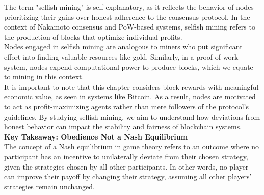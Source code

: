   The term "selfish mining" is self-explanatory, as it reflects the behavior of nodes prioritizing their gains over honest adherence to the consensus protocol. In the context of Nakamoto consensus and PoW-based systems, selfish mining refers to the production of blocks that optimize individual profits.\\
  Nodes engaged in selfish mining are analogous to miners who put significant effort into finding valuable resources like gold. Similarly, in a proof-of-work system, nodes expend computational power to produce blocks, which we equate to mining in this context.\\
  It is important to note that this chapter considers block rewards with meaningful economic value, as seen in systems like Bitcoin. As a result, nodes are motivated to act as profit-maximizing agents rather than mere followers of the protocol's guidelines. By studying selfish mining, we aim to understand how deviations from honest behavior can impact the stability and fairness of blockchain systems.\\
  
  \noindent\textbf{Key Takeaway: Obedience Not a Nash Equilibrium}\\
  The concept of a Nash equilibrium in game theory refers to an outcome where no participant has an incentive to unilaterally deviate from their chosen strategy, given the strategies chosen by all other participants. In other words, no player can improve their payoff by changing their strategy, assuming all other players' strategies remain unchanged.\\
  
